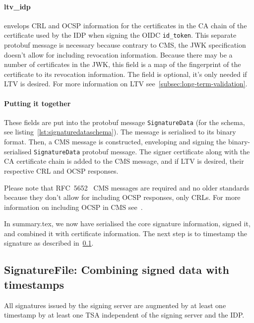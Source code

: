 \paragraph{ltv\_idp} envelops \gls{CRL} and \gls{OCSP} information for the certificates in the \gls{CA} chain of the certificate used by the \gls{IDP} when signing the \gls{OIDC} \texttt{id\_token}.
This separate protobuf message is necessary because contrary to \gls{CMS}, the \gls{JWK} specification~\cite{rfc7517} doesn't allow for including revocation information.
Because there may be a number of certificates in the \gls{JWK}, this field is a map of the fingerprint of the certificate to its revocation information.
The field is optional, it's only needed if \gls{LTV} is desired.
For more information on \gls{LTV} see~\ref{subsec:long-term-validation}.

\paragraph{Putting it together}

These fields are put into the protobuf message \texttt{SignatureData} (for the schema, see listing~\ref{lst:signaturedataschema}).
The message is serialised to its binary format.
Then, a \gls{CMS} message is constructed, enveloping and signing the binary-serialised \texttt{SignatureData} protobuf message.
The signer certificate along with the \gls{CA} certificate chain is added to the \gls{CMS} message, and if \gls{LTV} is desired,
their respective \gls{CRL} and \gls{OCSP} responses.

Please note that RFC~5652~\cite{rfc5652} \gls{CMS} messages are required and no older standards
because they don't allow for including \gls{OCSP} responses, only \gls{CRL}s.
For more information on including \gls{OCSP} in \gls{CMS} see~\cite[Section 10.2.1, RevocationInfoChoices and OtherRevocationInfoFormat]{rfc5652}.

In summary.tex, we now have serialised the core signature information, signed it, and combined it with certificate information.
The next step is to timestamp the signature as described in~\ref{subsec:signaturefile:-combining-signed-data-with-timestamps}.

\subsection{SignatureFile: Combining signed data with timestamps}\label{subsec:signaturefile:-combining-signed-data-with-timestamps}
All signatures issued by the signing server are augmented by at least one timestamp by at least one \gls{TSA} independent of the signing server and the \gls{IDP}.

